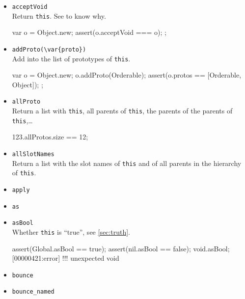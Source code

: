 \begin{itemize}
\item \lstinline|acceptVoid|\\
  Return \lstinline|this|.  See  to know why.
\begin{urbiscript}[firstnumber=last]
{
  var o = Object.new;
  assert(o.acceptVoid === o);
};
\end{urbiscript}


\item \lstinline|addProto(\var{proto})|\\
  Add  into the list of prototypes of \lstinline|this|.
\begin{urbiscript}[firstnumber=last]
{
  var o = Object.new;
  o.addProto(Orderable);
  assert(o.protos == [Orderable, Object]);
};
\end{urbiscript}

\item \lstinline|allProto|\\
  Return a list with \lstinline|this|, all parents of
  \lstinline|this|, the parents of the parents of
  \lstinline|this|,\ldots
\begin{urbiassert}[firstnumber=last]
123.allProtos.size == 12;
\end{urbiassert}

\item \lstinline|allSlotNames|\\
  Return a list with the slot names of \lstinline|this| and of all
  parents in the hierarchy of \lstinline|this|.

\item \lstinline|apply|\\

\item \lstinline|as|\\

\item \lstinline|asBool|\\
  Whether \lstinline|this| is ``true'', see \autoref{sec:truth}.

\begin{urbiscript}[firstnumber=last]
assert(Global.asBool == true);
assert(nil.asBool ==    false);
void.asBool;
[00000421:error] !!! unexpected void
\end{urbiscript}

\item \lstinline|bounce|\\

\item \lstinline|bounce_named|\\


\end{itemize}
